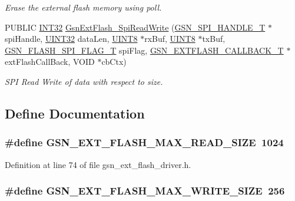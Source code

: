 \begin{DoxyCompactItemize}
\begin{DoxyCompactList}\small\item\em Erase the external flash memory using poll. \end{DoxyCompactList}\item 
PUBLIC \hyperlink{a00660_ga63021d67d54286c2163bcdb43a6f2569}{INT32} \hyperlink{a00664_ga3d33b60e6c2f80993970911c991a899f}{GsnExtFlash\_\-SpiReadWrite} (\hyperlink{a00238}{GSN\_\-SPI\_\-HANDLE\_\-T} $\ast$spiHandle, \hyperlink{a00660_gae1e6edbbc26d6fbc71a90190d0266018}{UINT32} dataLen, \hyperlink{a00660_gab27e9918b538ce9d8ca692479b375b6a}{UINT8} $\ast$rxBuf, \hyperlink{a00660_gab27e9918b538ce9d8ca692479b375b6a}{UINT8} $\ast$txBuf, \hyperlink{a00496_ae69f658e2fd080c54a78eb23e4be2f59}{GSN\_\-FLASH\_\-SPI\_\-FLAG\_\-T} spiFlag, \hyperlink{a00496_a501e29be4c0f8b2ab5c186eb8deb8874}{GSN\_\-EXTFLASH\_\-CALLBACK\_\-T} $\ast$extFlashCallBack, VOID $\ast$cbCtx)
\begin{DoxyCompactList}\small\item\em SPI Read Write of data with respect to size. \end{DoxyCompactList}\end{DoxyCompactItemize}


\subsection{Define Documentation}
\hypertarget{a00496_a6fe277ae9982666f92a5ce2ee623228b}{
\subsubsection[{GSN\_\-EXT\_\-FLASH\_\-MAX\_\-READ\_\-SIZE}]{\setlength{\rightskip}{0pt plus 5cm}\#define GSN\_\-EXT\_\-FLASH\_\-MAX\_\-READ\_\-SIZE~1024}}
\label{a00496_a6fe277ae9982666f92a5ce2ee623228b}


Definition at line 74 of file gsn\_\-ext\_\-flash\_\-driver.h.

\hypertarget{a00496_a84d812f8d1343cffc3524235f29193ef}{
\subsubsection[{GSN\_\-EXT\_\-FLASH\_\-MAX\_\-WRITE\_\-SIZE}]{\setlength{\rightskip}{0pt plus 5cm}\#define GSN\_\-EXT\_\-FLASH\_\-MAX\_\-WRITE\_\-SIZE~256}}
\label{a00496_a84d812f8d1343cffc3524235f29193ef}


